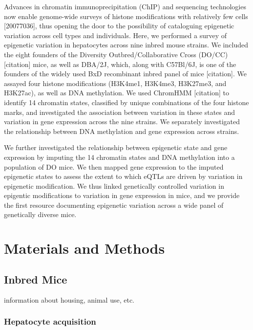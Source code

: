 \documentclass[10pt,letterpaper]{article}
\begin{document}
Advances in chromatin immunoprecipitation (ChIP) and sequencing
technologies now enable genome-wide surveys of histone modifications
with relatively few cells {[}20077036{]}, thus opening the door to the
possibility of cataloguing epigenetic variation across cell types and
individuals. Here, we performed a survey of epigenetic variation in
hepatocytes across nine inbred mouse strains. We included the eight
founders of the Diversity Outbred/Collaborative Cross (DO/CC)
{[}citation{]} mice, as well as DBA/2J, which, along with C57Bl/6J, is
one of the founders of the widely used BxD recombinant inbred panel of
mice {[}citation{]}. We assayed four histone modifications (H3K4me1,
H3K4me3, H3K27me3, and H3K27ac), as well as DNA methylation. We used
ChromHMM {[}citation{]} to identify 14 chromatin states, classified by
unique combinations of the four histone marks, and investigated the
association between variation in these states and variation in gene
expression across the nine strains. We separately investigated the
relationship between DNA methylation and gene expression across strains.

We further investigated the relationship between epigenetic state and
gene expression by imputing the 14 chromatin states and DNA methylation
into a population of DO mice. We then mapped gene expression to the
imputed epigenetic states to assess the extent to which eQTLs are driven
by variation in epigenetic modification. We thus linked genetically
controlled variation in epigentic modifications to variation in gene
expression in mice, and we provide the first resource documenting
epigenetic variation across a wide panel of genetically diverse mice.

\hypertarget{materials-and-methods}{%
\section{Materials and Methods}\label{materials-and-methods}}

\hypertarget{inbred-mice}{%
\subsection{Inbred Mice}\label{inbred-mice}}

information about housing, animal use, etc.

\hypertarget{hepatocyte-acquisition}{%
\subsubsection{Hepatocyte acquisition}\label{hepatocyte-acquisition}}
\end{document}
